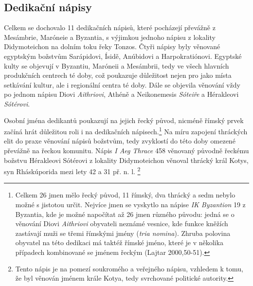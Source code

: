 
\subsection[dedikační-nápisy-9]{Dedikační nápisy}

Celkem se dochovalo 11 dedikačních nápisů, které pocházejí převážně z Mesámbrie, Maróneie a Byzantia, s výjimkou jednoho nápisu z lokality Didymoteichon na dolním toku řeky Tonzos. Čtyři nápisy byly věnované egyptským božstvům Sarápidovi, Ísidě, Anúbidovi a Harpokratiónovi. Egyptské kulty se objevují v Byzantiu, Maróneii a Mesámbrii, tedy ve všech hlavních produkčních centrech té doby, což poukazuje důležitost nejen pro jako místa setkávání kultur, ale i regionální centra té doby. Dále se objevila věnování vždy po jednom nápisu Diovi {\em Aithriovi}, Athéně a Neikonemesis {\em Sóteiře} a Hérakleovi {\em Sótérovi}.

Osobní jména dedikantů poukazují na jejich řecký původ, nicméně římský prvek začíná hrát důležitou roli i na dedikačních nápisech.\footnote{Celkem 26 jmen mělo řecký původ, 11 římský, dva thrácký a sedm nebylo možné s jistotou určit. Nejvíce jmen se vyskytlo na nápise {\em IK Byzantion} 19 z Byzantia, kde je možné napočítat až 26 jmen různého původu: jedná se o věnování Diovi {\em Aithriovi} obyvateli neznámé vesnice, kde funkce kněžích zastávají muži se třemi římskými jmény ({\em tria nomina}). Zhruba polovina obyvatel na této dedikaci má taktéž římské jméno, které je v několika případech kombinované se jménem řeckým (Lajtar 2000,50-51).} Na míru zapojení thráckých elit do praxe věnování nápisů božstvům, tedy zvyklostí do této doby omezené převážně na řeckou komunitu. Nápis {\em I Aeg Thrace} 458 věnovaný původně řeckému božstvu Hérakleovi Sótérovi z lokality Didymoteichon věnoval thrácký král Kotys, syn Rháskúporida mezi lety 42 a 31 př. n. l. \footnote{Tento nápis je na pomezí soukromého a veřejného nápisu, vzhledem k tomu, že byl věnován jménem krále Kotya, tedy svrchované politické autority.}

